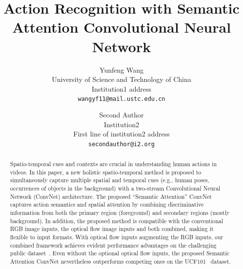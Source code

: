 \documentclass[10pt,twocolumn,letterpaper]{article}
\begin{document}
\title{Action Recognition with Semantic Attention Convolutional Neural Network}
%
\author{Yunfeng Wang\\
University of Science and Technology of China\\
Institution1 address\\
{\tt\small wangyf11@mail.ustc.edu.cn}
\and
Second Author\\
Institution2\\
First line of institution2 address\\
{\tt\small secondauthor@i2.org}
}

\maketitle


\begin{abstract}
Spatio-temporal cues and contexts are crucial in understanding human actions in videos. In this paper, a new holistic spatio-temporal method is proposed to simultaneously capture multiple spatial and temporal cues (e.g., human poses, occurrences of objects in the background) with a two-stream Convolutional Neural Network (ConvNet) architecture. The proposed ``Semantic Attention'' ConvNet captures action semantics and spatial attention by combining discriminative information from both the primary region (foreground) and secondary regions (mostly background). In addition, the proposed method is compatible with the conventional RGB image inputs, the optical flow image inputs and both combined, making it flexible to input formats. With optical flow inputs augmenting the RGB inputs, our combined framework achieves evident performance advantages on the challenging public dataset~\cite{soomro2012ucf101}. Even without the optional optical flow inputs, the proposed Semantic Attention ConvNet nevertheless outperforms competing ones on the UCF101~\cite{soomro2012ucf101} dataset. 
%
\end{abstract}



\end{document}
